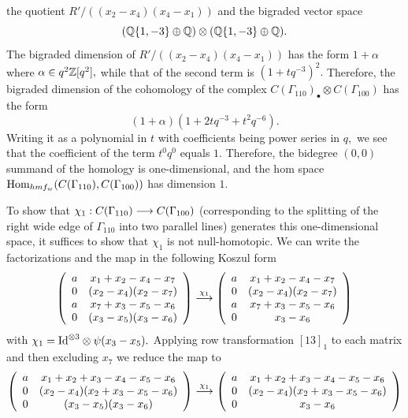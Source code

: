 \documentclass[12pt]{article}
\begin{document}
the quotient $R'/((x_2-x_4)(x_4-x_1))$ and the bigraded 
vector space
$$(\mathbb Q\{1,-3\} \oplus \mathbb Q )\otimes (\mathbb Q\{1,-3\} \oplus \mathbb Q ).$$ 
The bigraded dimension of $R'/((x_2-x_4)(x_4-x_1))$ has 
the form $1+\alpha$ where $\alpha\in q^2 \mathbb Z[q^2],$ while 
that of the second term is 
$(1+ tq^{-3})^2.$ Therefore, the bigraded dimension of 
the cohomology of the complex $C(\Gamma_{110})_{\bullet}\otimes 
C(\Gamma_{100})$ has the form 
$$(1+\alpha)(1+ 2t q^{-3}+ t^2 q^{-6}).$$
Writing it as a polynomial in $t$ with coefficients being power 
series in $q,$ we see that the coefficient of the term $t^0 q^0$ 
equals $1.$ Therefore, the bidegree $(0,0)$ summand of the homology 
is one-dimensional, and the hom space 
$\mathrm{Hom}_{hmf_w}(C(\Gamma_{110}), C(\Gamma_{100}))$
has dimension $1.$ 

To show that $\chi_1: C(\Gamma_{110})\longrightarrow 
C(\Gamma_{100})$ (corresponding to the splitting of the right wide 
edge of $\Gamma_{110}$ into two parallel lines) 
 generates this one-dimensional space, it suffices to show that 
$\chi_1$ is not null-homotopic. We can write the factorizations and 
the map in the following Koszul form 
$$ \left( \begin{array}{cc} a & x_1+x_2-x_4-x_7  \\ 
  0 & (x_2-x_4)(x_2-x_7)  \\
  a & x_7+x_3-x_5-x_6  \\
  0 & (x_3-x_5)(x_3-x_6) \end{array} \right) \stackrel{\chi_1}{\longrightarrow} 
  \left( \begin{array}{cc} a & x_1+x_2-x_4-x_7  \\ 
  0 & (x_2-x_4)(x_2-x_7)  \\
  a & x_7+x_3-x_5-x_6  \\
  0 & x_3-x_6 \end{array} \right) $$ 
with $\chi_1=\mathrm{Id}^{\otimes 3}\otimes \psi(x_3-x_5).$ Applying 
row transformation $[13]_1$ to each matrix and then excluding $x_7$ 
we reduce the map to 
$$ \left( \begin{array}{cc} a & x_1+x_2+x_3-x_4-x_5-x_6  \\ 
  0 & (x_2-x_4)(x_2+x_3-x_5-x_6)  \\
  0 & (x_3-x_5)(x_3-x_6) \end{array} \right) \stackrel{\chi_1}{\longrightarrow} 
  \left( \begin{array}{cc} a & x_1+x_2+x_3-x_4-x_5-x_6  \\ 
  0 & (x_2-x_4)(x_2+x_3-x_5-x_6)  \\
  0 & x_3-x_6 \end{array} \right) $$ 
\end{document}
